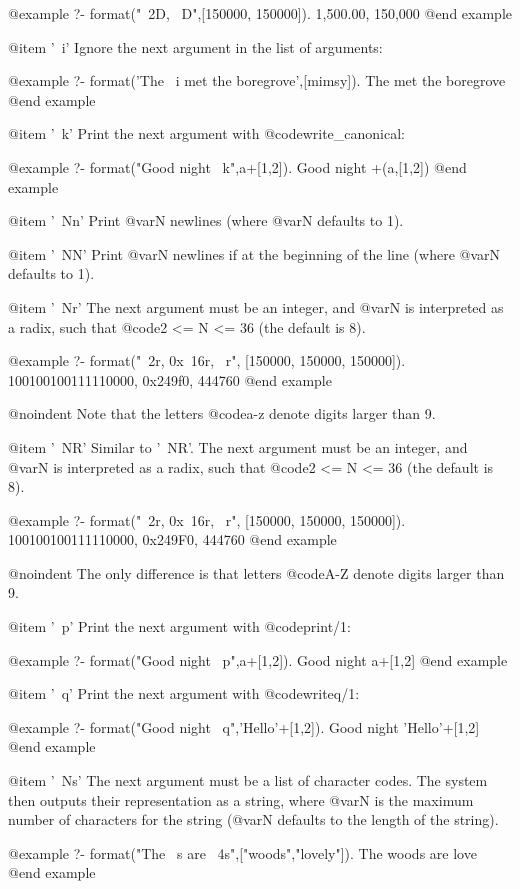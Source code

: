 {{{{{{@example
?- format("~2D, ~D",[150000, 150000]).
1,500.00, 150,000
@end example

@item '~i'
Ignore the next argument in the list of arguments:

@example
?- format('The ~i met the boregrove',[mimsy]).
The  met the boregrove
@end example

@item '~k'
Print the next argument with @code{write_canonical}:

@example
?- format("Good night ~k",a+[1,2]).
Good night +(a,[1,2])
@end example

@item '~Nn'
Print @var{N} newlines (where @var{N} defaults to 1).

@item '~NN'
Print @var{N} newlines if at the beginning of the line (where @var{N}
defaults to 1).

@item '~Nr'
The next argument must be an integer, and @var{N} is interpreted as a
radix, such that @code{2 <= N <= 36} (the default is 8).

@example
?- format("~2r, 0x~16r, ~r",
          [150000, 150000, 150000]).
100100100111110000, 0x249f0, 444760
@end example

@noindent
Note that the letters @code{a-z} denote digits larger than 9.

@item '~NR'
Similar to '~NR'. The next argument must be an integer, and @var{N} is
interpreted as a radix, such that @code{2 <= N <= 36} (the default is 8).

@example
?- format("~2r, 0x~16r, ~r",
          [150000, 150000, 150000]).
100100100111110000, 0x249F0, 444760
@end example

@noindent
The only difference is that letters @code{A-Z} denote digits larger than 9.

@item '~p'
Print the next argument with @code{print/1}:

@example
?- format("Good night ~p",a+[1,2]).
Good night a+[1,2]
@end example

@item '~q'
Print the next argument with @code{writeq/1}:

@example
?- format("Good night ~q",'Hello'+[1,2]).
Good night 'Hello'+[1,2]
@end example

@item '~Ns'
The next argument must be a list of character codes. The system then
outputs their representation as a string, where @var{N} is the maximum
number of characters for the string (@var{N} defaults to the length of the
string).

@example
?- format("The ~s are ~4s",["woods","lovely"]).
The woods are love
@end example

}}}}}}
